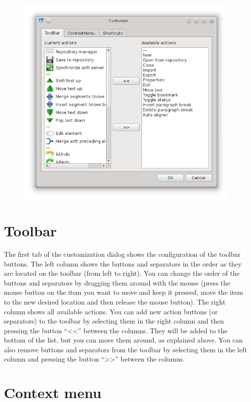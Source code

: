 \documentclass[a4paper,10pt,oneside]{book}
\begin{document}
\begin{figure}[htbf]
 \includegraphics[width=\textwidth]{screenshots/customize_toolbar.png}
\end{figure}

\section{Toolbar}\label{ch:detail:custom:toolbar}

The first tab of the customization dialog shows the configuration of the toolbar buttons. The left column shows the buttons and separators in the order as they are located on the toolbar (from left to right). You can change the order of the buttons and separators by dragging them around with the mouse (press the mouse button on the item you want to move and keep it pressed, move the item to the new desired location and then release the mouse button).
The right column shows all available actions. You can add new action buttons (or separators) to the toolbar by selecting them in the right column and then pressing the button ``<<'' between the columns. They will be added to the bottom of the list, but you can move them around, as explained above. You can also remove buttons and separators from the toolbar by selecting them in the left column and pressing the button ``>>'' between the columns.

\section{Context menu}\label{ch:detail:custom:contextmenu}
\end{document}
